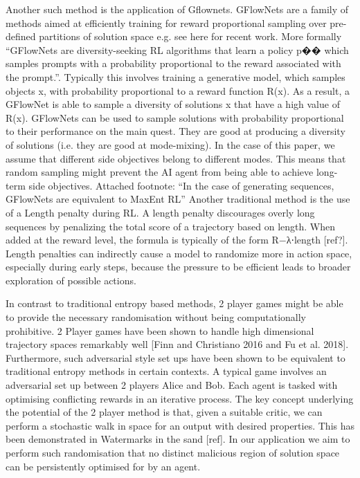 \documentclass{article}
\begin{document}
Another such method is the application of Gflownets. GFlowNets are a family of methods aimed at efficiently training for reward proportional sampling over pre-defined partitions of solution space e.g. see here for recent work. More formally “GFlowNets are diversity-seeking RL algorithms that learn a policy p�� which samples prompts with a probability proportional to the reward associated with the prompt.”. Typically this involves training a generative model, which samples objects x, with probability proportional to a reward function R(x). As a result, a GFlowNet is able to sample a diversity of solutions x that have a high value of R(x). GFlowNets can be used to sample solutions with probability proportional to their performance on the main quest. They are good at producing a diversity of solutions (i.e. they are good at mode-mixing). In the case of this paper, we assume that different side objectives belong to different modes. This means that random sampling might prevent the AI agent from being able to achieve long-term side objectives. 
Attached footnote: “In the case of generating sequences, GFlowNets are equivalent to MaxEnt RL”
Another traditional method is the use of a Length penalty during RL. A length penalty discourages overly long sequences by penalizing the total score of a trajectory based on length. When added at the reward level, the formula is typically of the form R−λ⋅length [ref?]. Length penalties can indirectly cause a model to randomize more in action space, especially during early steps, because the pressure to be efficient leads to broader exploration of possible actions.

In contrast to traditional entropy based methods, 2 player games might be able to provide the necessary randomisation without being computationally prohibitive. 2 Player games have been shown to handle high dimensional trajectory spaces remarkably well [Finn and Christiano 2016 and Fu et al. 2018]. Furthermore, such adversarial style set ups have been shown to be equivalent to traditional entropy methods in certain contexts. A typical game involves an adversarial set up between 2 players Alice and Bob. Each agent is tasked with optimising conflicting rewards in an iterative process. The key concept underlying the potential of the 2 player method is that, given a suitable critic, we can perform a stochastic walk in space for an output with desired properties. This has been demonstrated in Watermarks in the sand [ref]. In our application we aim to perform such randomisation that no distinct malicious region of solution space can be persistently optimised for by an agent. 
\end{document}
